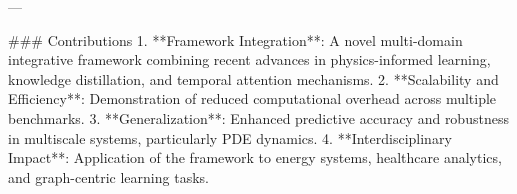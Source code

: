 ---

### Contributions  
1. **Framework Integration**: A novel multi-domain integrative framework combining recent advances in physics-informed learning, knowledge distillation, and temporal attention mechanisms.
2. **Scalability and Efficiency**: Demonstration of reduced computational overhead across multiple benchmarks.
3. **Generalization**: Enhanced predictive accuracy and robustness in multiscale systems, particularly PDE dynamics.
4. **Interdisciplinary Impact**: Application of the framework to energy systems, healthcare analytics, and graph-centric learning tasks.

